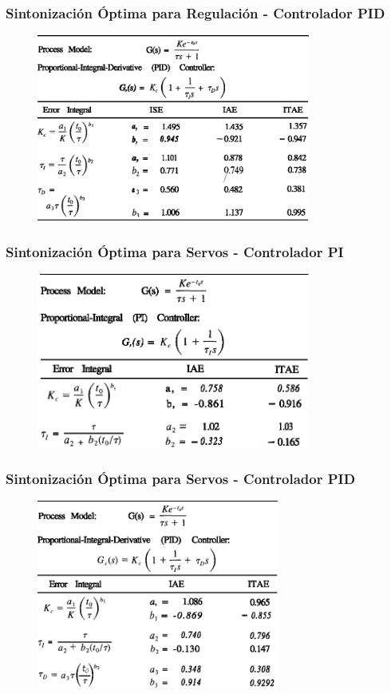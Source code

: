 \documentclass[aspectratio=169,handout]{beamer}
\theoremstyle{definition}
\theoremstyle{plain}
\theoremstyle{remark}
\begin{document}
\begin{frame}[<+->]\frametitle{Sintonización Óptima para Regulación - Controlador PID}
\begin{figure}
	\includegraphics[width=9cm]{images/criteriosOptimosPID.eps}
\end{figure}
\end{frame}

\begin{frame}[<+->]\frametitle{Sintonización Óptima para Servos - Controlador PI}
\begin{figure}
	\includegraphics[width=9cm]{images/criteriosOptimosServoPI.eps}
\end{figure}
\end{frame}

\begin{frame}[<+->]\frametitle{Sintonización Óptima para Servos - Controlador PID}
\begin{figure}
	\includegraphics[width=8cm]{images/criteriosOptimosServoPID.eps}
\end{figure}
\end{frame}
\end{document}
